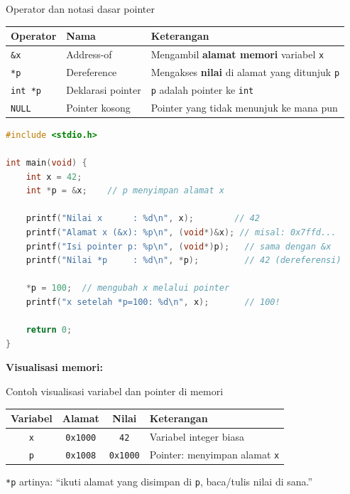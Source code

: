 \documentclass[../main.tex]{subfiles}
\begin{document}
\begin{modultable}[]{Operator dan notasi dasar pointer}
\begin{tabular}{|l|l|p{7cm}|}
\hline
\textbf{Operator} & \textbf{Nama} & \textbf{Keterangan} \\
\hline
\texttt{\&x} & Address-of & Mengambil \textbf{alamat memori} variabel \texttt{x} \\
\hline
\texttt{*p} & Dereference & Mengakses \textbf{nilai} di alamat yang ditunjuk \texttt{p} \\
\hline
\texttt{int *p} & Deklarasi pointer & \texttt{p} adalah pointer ke \texttt{int} \\
\hline
\texttt{NULL} & Pointer kosong & Pointer yang tidak menunjuk ke mana pun \\
\hline
\end{tabular}
\end{modultable}

\begin{lstlisting}[language=C,caption=Dasar pointer --- alamat dan dereferensi]
#include <stdio.h>

int main(void) {
    int x = 42;
    int *p = &x;    // p menyimpan alamat x
    
    printf("Nilai x      : %d\n", x);        // 42
    printf("Alamat x (&x): %p\n", (void*)&x); // misal: 0x7ffd...
    printf("Isi pointer p: %p\n", (void*)p);   // sama dengan &x
    printf("Nilai *p     : %d\n", *p);         // 42 (dereferensi)
    
    *p = 100;  // mengubah x melalui pointer
    printf("x setelah *p=100: %d\n", x);       // 100!
    
    return 0;
}
\end{lstlisting}

\begin{konsep}
\textbf{Visualisasi memori:}

\begin{modultable}[]{Contoh visualisasi variabel dan pointer di memori}
\begin{tabular}{|c|c|c|l|}
\hline
\textbf{Variabel} & \textbf{Alamat} & \textbf{Nilai} & \textbf{Keterangan} \\
\hline
\texttt{x} & \texttt{0x1000} & \texttt{42} & Variabel integer biasa \\
\hline
\texttt{p} & \texttt{0x1008} & \texttt{0x1000} & Pointer: menyimpan alamat \texttt{x} \\
\hline
\end{tabular}
\end{modultable}

\texttt{*p} artinya: ``ikuti alamat yang disimpan di \texttt{p}, baca/tulis nilai di sana.''
\end{konsep}
\end{document}
